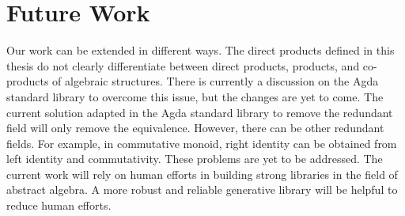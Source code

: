\section{Future Work}
\label{future}
Our work can be extended in different ways. The direct products defined in this
thesis do not clearly differentiate between direct products, products, and
co-products of algebraic structures. There is currently a discussion on the Agda
standard library to overcome this issue, but the changes are yet to come. The
current solution adapted in the Agda standard library to remove the redundant
field will only remove the equivalence. However, there can be other redundant
fields. For example, in commutative monoid, right identity can be obtained from
left identity and commutativity. These problems are yet to be addressed. The
current work will rely on human efforts in building strong libraries in the
field of abstract algebra. A more robust and reliable generative library will be
helpful to reduce human efforts. 